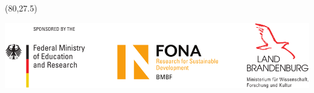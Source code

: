 \documentclass[19pt]{beamer}
\begin{document}
\begin{frame}
%
        \begin{textblock}{20}(80,27.5)
            \begin{WhiteBox}
                \vspace{-1cm}
                \begin{block}{}
                    \includegraphics[width=\textwidth]{img/Sponsor_logos}
                \end{block}
            \end{WhiteBox}
        \end{textblock}
    \end{frame}
\end{document}
